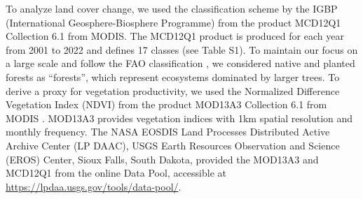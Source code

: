 \documentclass[
  authoryear,
  preprint,
  3p,
  onecolumn]{elsarticle}
\begin{document}
To analyze land cover change, we used the classification scheme by the
IGBP (International Geosphere-Biosphere Programme) from the product
MCD12Q1 Collection 6.1 from MODIS. The MCD12Q1 product is produced for
each year from 2001 to 2022 and defines 17 classes (see Table S1). To
maintain our focus on a large scale and follow the FAO classification
\citep{FAO2022}, we considered native and planted forests as
``forests'', which represent ecosystems dominated by larger trees. To
derive a proxy for vegetation productivity, we used the Normalized
Difference Vegetation Index (NDVI) from the product MOD13A3 Collection
6.1 from MODIS \citep{Didan2015}. MOD13A3 provides vegetation indices
with 1km spatial resolution and monthly frequency. The NASA EOSDIS Land
Processes Distributed Active Archive Center (LP DAAC), USGS Earth
Resources Observation and Science (EROS) Center, Sioux Falls, South
Dakota, provided the MOD13A3 and MCD12Q1 from the online Data Pool,
accessible at \url{https://lpdaa.usgs.gov/tools/data-pool/}.

\begin{table}


\caption{\label{tab-desEOD}Description of the satellite and reanalysis data used}

\end{table}%
\end{document}
